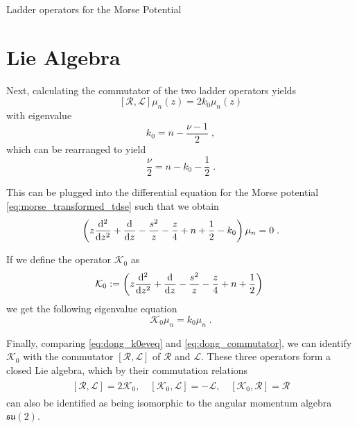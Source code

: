 \begin{chapter}{Ladder operators for the Morse Potential}
\section{Lie Algebra} %
\label{sec:LieAlgebra}
Next, calculating the commutator of the two ladder operators yields
\begin{equation}
    \label{eq:dong_commutator}
    [\mathcal{R},\mathcal{L}]\mu_n(z)=2k_0\mu_n(z)
\end{equation}
with eigenvalue
\begin{equation}
    \label{eq:dong_k0_ev}
    k_0=n-\frac{\nu-1}{2}\;,
\end{equation}
which can be rearranged to yield
\begin{equation}
\label{eq:dong_k0_ev2}
\frac{\nu}{2}=n-k_0-\frac{1}{2}\;.
\end{equation}

This can be plugged into the differential equation for the Morse potential \eqref{eq:morse_transformed_tdse} such that we obtain
\begin{equation}
\left( z\frac{\mathrm{d}^{2}}{\mathrm{d}z^{2}}+\frac{\mathrm{d}^{}}{\mathrm{d}z^{}}-\frac{s^2}{z}-\frac{z}{4}+n+\frac{1}{2} 
-k_0 \right)\mu_n=0\; .
\end{equation}

If we define the operator $\mathcal{K}_0$ as
\begin{equation}
    \mathcal{K}_0:=\left( z\frac{\mathrm{d}^{2}}{\mathrm{d}z^{2}}+\frac{\mathrm{d}^{}}{\mathrm{d}z^{}}-\frac{s^2}{z}-\frac{z}{4}+n+\frac{1}{2}  \right)\;
\end{equation}
we get the following eigenvalue equation
\begin{equation}
\label{eq:dong_k0eveq}
\mathcal{K}_0\mu_n=k_0\mu_n\; .
\end{equation}

Finally, comparing \eqref{eq:dong_k0eveq} and \eqref{eq:dong_commutator}, we can identify
$\mathcal{K}_0$ with the commutator $[\mathcal{R},\mathcal{L}]$ of $\mathcal{R}$ and $\mathcal{L}$. These three operators form a closed Lie algebra, which by their commutation relations
\begin{align}
    \begin{split}
	[\mathcal{R},\mathcal{L}]=2\mathcal{K}_0,\quad  [\mathcal{K}_0,\mathcal{L}]=-\mathcal{L},\quad
	[\mathcal{K}_0,\mathcal{R}]=\mathcal{R}      
    \end{split}
\end{align}
can also be identified as being isomorphic to the angular momentum algebra $\mathfrak{su}(2)$.\\


\end{chapter}
